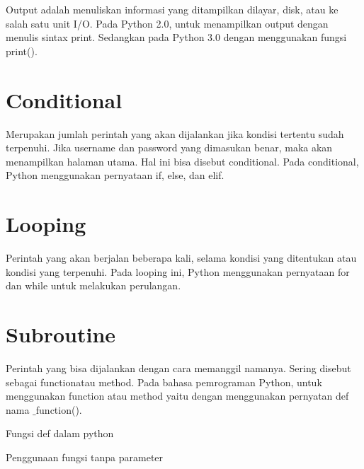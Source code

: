{{{{{\noindent 
{\fontsize{14pt}{14pt}\selectfont Output $  $adalah menuliskan informasi yang ditampilkan dilayar, $  $disk, atau ke salah satu unit I/O. Pada Python 2.0, untuk menampilkan $  $output $  $dengan menulis sintax print. Sedangkan pada Python 3.0 dengan menggunakan fungsi print(). \\} \par
\vspace{14pt}
\noindent 
{\fontsize{14pt}{14pt}\section {Conditional}
\noindent 
{\fontsize{14pt}{14pt}\selectfont Merupakan jumlah perintah yang akan dijalankan jika kondisi tertentu sudah terpenuhi. Jika $  $username $  $dan $  $password $  $yang dimasukan benar, maka akan menampilkan halaman utama. Hal ini bisa disebut $  $conditional. $  $Pada $  $conditional, $  $Python menggunakan pernyataan if, else, dan elif. \\} \par
\vspace{14pt}
\noindent 
{\fontsize{14pt}{14pt}\section {Looping}
\noindent 
{\fontsize{14pt}{14pt}\selectfont Perintah yang akan berjalan beberapa kali, selama kondisi yang ditentukan atau kondisi yang terpenuhi. Pada $  $looping $  $ini, Python menggunakan pernyataan for dan while untuk melakukan perulangan. \\} \par
\vspace{14pt}
\noindent 
{\fontsize{14pt}{14pt}\section {Subroutine}
\noindent 
{\fontsize{14pt}{14pt}\selectfont Perintah yang bisa dijalankan dengan cara memanggil namanya. Sering disebut sebagai $  $functionatau $  $method. Pada bahasa pemrograman Python, untuk menggunakan $  $function $  $atau $  $method $  $yaitu dengan menggunakan pernyatan $  $def nama $  \_  $function(). \\} \par
\vspace{14pt}
\noindent 
{\fontsize{14pt}{14pt}\selectfont Fungsi def dalam python \\} \par
\noindent 
{\fontsize{14pt}{14pt}\selectfont Penggunaan fungsi tanpa parameter \\} \par
}}}}}}}}
